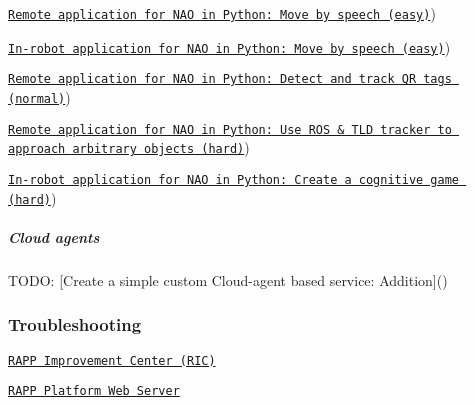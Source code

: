 \begin{DoxyItemize}
\item \href{https://github.com/rapp-project/rapp-platform/wiki/Create-a-remote-robotic-application-for-NAO-in-Python-(novice}{\tt Remote application for N\-A\-O in Python\-: Move by speech (easy)})
\item \href{https://github.com/rapp-project/rapp-platform/wiki/Create-an-in-robot-application-for-NAO-in-Python-(novice}{\tt In-\/robot application for N\-A\-O in Python\-: Move by speech (easy)})
\item \href{https://github.com/rapp-project/rapp-platform/wiki/Remote-application-for-NAO-in-Python:-Detect-and-track-QR-tags-(normal}{\tt Remote application for N\-A\-O in Python\-: Detect and track Q\-R tags (normal)})
\item \href{https://github.com/rapp-project/rapp-platform/wiki/Remote-application-for-NAO-in-Python:-Use-ROS-&-TLD-tracker-to-approach-arbitrary-objects-(hard}{\tt Remote application for N\-A\-O in Python\-: Use R\-O\-S \& T\-L\-D tracker to approach arbitrary objects (hard)})
\item \href{https://github.com/rapp-project/rapp-platform/wiki/In-robot-application-for-NAO-in-Python:-Create-a-cognitive-game-(hard}{\tt In-\/robot application for N\-A\-O in Python\-: Create a cognitive game (hard)})
\end{DoxyItemize}

\subparagraph*{Cloud agents}


\begin{DoxyItemize}
\item T\-O\-D\-O\-: \mbox{[}Create a simple custom Cloud-\/agent based service\-: Addition\mbox{]}()
\end{DoxyItemize}

\subsubsection*{Troubleshooting}


\begin{DoxyItemize}
\item \href{https://github.com/rapp-project/rapp-platform/wiki/Troubleshooting-RAPP-Improvement-Center}{\tt R\-A\-P\-P Improvement Center (R\-I\-C)}
\item \href{https://github.com/rapp-project/rapp-platform/wiki/Troubleshooting-RAPP-Platform-Web-Server}{\tt R\-A\-P\-P Platform Web Server} 
\end{DoxyItemize}